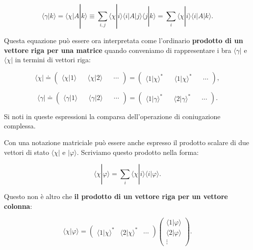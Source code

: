 \documentclass[a4paper,12pt,oneside]{book}
\begin{document}
\begin{equation}
\langle \gamma | k \rangle = \langle \chi | A | k \rangle \equiv \sum \limits_{i,j}  \langle \chi | i \rangle \langle i | A | j \rangle  \langle j | k \rangle = \sum \limits_{i} \langle \chi | i \rangle  \langle i | A | k \rangle .
\end{equation}

Questa equazione può essere ora interpretata come l'ordinario \textbf{prodotto di un vettore riga per una matrice} quando conveniamo di rappresentare i bra $ \langle \gamma |$ e  $\langle \chi |$ in termini di vettori riga:

\begin{equation}
\langle \chi | \doteq 
\begin{pmatrix}
\langle \chi | 1 \rangle && \langle \chi | 2 \rangle && \cdots 
\end{pmatrix}
 = 
\begin{pmatrix}
\langle 1 | \chi \rangle ^* && \langle 1 | \chi \rangle ^* && \cdots
\end{pmatrix} ,
\end{equation}

\begin{equation}
\langle \gamma | \doteq 
\begin{pmatrix}
\langle \gamma | 1 \rangle && \langle \gamma | 2 \rangle && \cdots 
\end{pmatrix}
 = 
\begin{pmatrix}
\langle 1 | \gamma \rangle ^* && \langle 2 | \gamma \rangle ^* && \cdots
\end{pmatrix} .
\end{equation}

Si noti in queste espressioni la comparsa dell'operazione di coniugazione complessa.

Con una notazione matriciale può essere anche espresso il prodotto scalare di due vettori di stato $\langle \chi |$ e $ | \varphi \rangle $. Scriviamo questo prodotto nella forma:

\begin{equation}
\langle \chi | \varphi \rangle = \sum \limits_{i} \langle \chi | i \rangle \langle i | \varphi \rangle .
\end{equation}

Questo non è altro che \textbf{il prodotto di un vettore riga per un vettore colonna}:

\begin{equation}
\langle \chi | \varphi \rangle = 
\begin{pmatrix}
\langle 1 | \chi \rangle ^* & \langle 2 | \chi \rangle ^* & \cdots 
\end{pmatrix} 
\begin{pmatrix}
\langle 1 | \varphi \rangle \\ 
\langle 2 | \varphi \rangle 
\\ \vdots 
\end{pmatrix} .
\end{equation}
\end{document}
